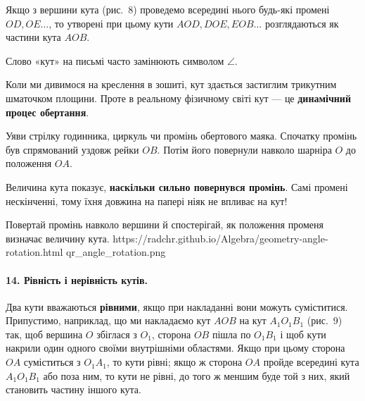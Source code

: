 Якщо з вершини кута (рис.~8) проведемо всередині нього будь-які промені $OD, OE \dots$, то утворені при цьому кути $AOD, DOE, EOB \dots$ розглядаються як частини кута $AOB$.

Слово «кут» на письмі часто замінюють символом $\angle$.

\begin{feynmanbox}
Коли ми дивимося на креслення в зошиті, кут здається застиглим трикутним шматочком площини. Проте в реальному фізичному світі кут — це \textbf{динамічний процес обертання}.

Уяви стрілку годинника, циркуль чи промінь обертового маяка. Спочатку промінь був спрямований уздовж рейки $OB$. Потім його повернули навколо шарніра $O$ до положення $OA$. 

Величина кута показує, \textbf{наскільки сильно повернувся промінь}. Самі промені нескінченні, тому їхня довжина на папері ніяк не впливає на кут!
\end{feynmanbox}

%
{Повертай промінь навколо вершини й спостерігай, як положення променя визначає величину кута.}%
{https://radchr.github.io/Algebra/geometry-angle-rotation.html}%
{qr_angle_rotation.png}

\paragraph{14. Рівність і нерівність кутів.}
Два кути вважаються \textbf{рівними}, якщо при накладанні вони можуть суміститися. Припустимо, наприклад, що ми накладаємо кут $AOB$ на кут $A_1O_1B_1$ (рис.~9) так, щоб вершина $O$ збіглася з $O_1$, сторона $OB$ пішла по $O_1B_1$ і щоб кути накрили один одного своїми внутрішніми областями. Якщо при цьому сторона $OA$ суміститься з $O_1A_1$, то кути рівні; якщо ж сторона $OA$ пройде всередині кута $A_1O_1B_1$ або поза ним, то кути не рівні, до того ж меншим буде той з них, який становить частину іншого кута.

\begin{center}
\end{center}

